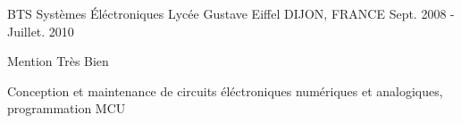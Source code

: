\begin{cventries}
  \cventry
    {BTS Systèmes \'Eléctroniques} %
    {Lycée Gustave Eiffel} %
    {DIJON, FRANCE} %
    {Sept. 2008 - Juillet. 2010} %
    {
      \begin{cvitems} %
      \item {Mention Très Bien}
      \item {Conception et maintenance de circuits éléctroniques numériques et analogiques, programmation MCU}
      \end{cvitems}
    }
\end{cventries}

